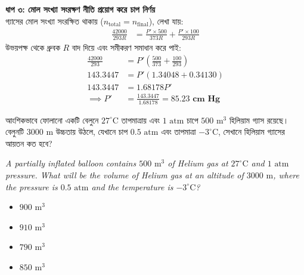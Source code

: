 \documentclass[12pt, a4paper]{article}
\begin{document}
\begin{tcolorbox}[solutionbox={সমাধান (Solution)}]
    \vspace{0.4em}
    \noindent\textbf{ধাপ ৩: মোল সংখ্যা সংরক্ষণ নীতি প্রয়োগ করে চাপ নির্ণয়} \\
    গ্যাসের মোল সংখ্যা সংরক্ষিত থাকায় ($n_{\text{total}} = n_{\text{final}}$), লেখা যায়:
    \begin{align*}
        \frac{42000}{293 R} &= \frac{P' \times 500}{373 R} + \frac{P' \times 100}{293 R}
    \end{align*}
    উভয়পক্ষ থেকে ধ্রুবক $R$ বাদ দিয়ে এবং সমীকরণ সমাধান করে পাই:
    \begin{align*}
        \frac{42000}{293} &= P' \left(\frac{500}{373} + \frac{100}{293}\right) \\
        143.3447 &= P' (1.34048 + 0.34130) \\
        143.3447 &= 1.68178 P' \\
        \implies P' &= \frac{143.3447}{1.68178} = \mathbf{85.23\text{ cm Hg}}
    \end{align*}
\end{tcolorbox}

\begin{tcolorbox}[questionbox={প্রশ্ন (Question) 3}]
    \noindent
    আংশিকভাবে ফোলানো একটি বেলুনে $27^\circ\text{C}$ তাপমাত্রায় এবং $1\text{ atm}$ চাপে $500\text{ m}^3$ হিলিয়াম গ্যাস রয়েছে। বেলুনটি $3000\text{ m}$ উচ্চতায় উঠলে, যেখানে চাপ $0.5\text{ atm}$ এবং তাপমাত্রা $-3^\circ\text{C}$, সেখানে হিলিয়াম গ্যাসের আয়তন কত হবে?
    
    \vspace{0.8em}
    \begin{english}
    \noindent\textit{\color{darkgray}
    A partially inflated balloon contains $500\text{ m}^3$ of Helium gas at $27^\circ\text{C}$ and $1\text{ atm}$ pressure. What will be the volume of Helium gas at an altitude of $3000\text{ m}$, where the pressure is $0.5\text{ atm}$ and the temperature is $-3^\circ\text{C}$?
    }
    \end{english}
\end{tcolorbox}

\begin{itemize}[label={}, leftmargin=1cm, itemsep=0.5em]
    \item[\textbf{A)}] $900\text{ m}^3$
    \item[\textbf{B)}] $910\text{ m}^3$
    \item[\textbf{C)}] $790\text{ m}^3$
    \item[\textbf{D)}] $850\text{ m}^3$
\end{itemize}
\end{document}
